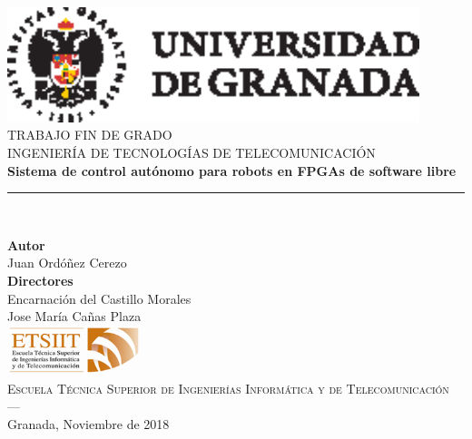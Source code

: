 \begin{titlepage}
 
 
\newlength{\centeroffset}
\setlength{\centeroffset}{-0.5\oddsidemargin}
\addtolength{\centeroffset}{0.5\evensidemargin}
\thispagestyle{empty}

\noindent\hspace*{\centeroffset}\begin{minipage}{\textwidth}

\centering
\includegraphics[width=0.9\textwidth]{imagenes/logo_ugr.eps}\\[1.4cm]


\textsc{ \Large TRABAJO FIN DE GRADO\\[0.2cm]}
\textsc{INGENIERÍA DE TECNOLOGÍAS DE TELECOMUNICACIÓN}\\[1cm]
% 
{\Huge\bfseries  Sistema de
	control autónomo para robots en FPGAs de
	software libre\\
}
\noindent\rule[-1ex]{\textwidth}{3pt}\\[3.5ex]
{\large\bfseries } %
\end{minipage}

\vspace{1cm}
\noindent\hspace*{\centeroffset}\begin{minipage}{\textwidth}
\centering

\textbf{Autor}\\ {Juan Ordóñez Cerezo}\\[2.5ex]
\textbf{Directores}\\
{Encarnación del Castillo Morales\\
Jose María Cañas Plaza}\\[2cm]
\includegraphics[width=0.3\textwidth]{imagenes/etsiit_logo.png}\\[0.1cm]
\textsc{Escuela Técnica Superior de Ingenierías Informática y de Telecomunicación}\\
\textsc{---}\\
Granada, Noviembre de 2018
\end{minipage}
\end{titlepage}


